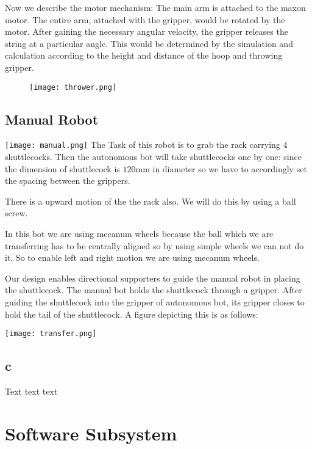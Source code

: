 \documentclass[11pt]{article}
\begin{document}
Now we describe the motor mechanism: 
The main arm is attached to the maxon motor. The entire arm,  attached with the gripper, would be rotated by the motor.
After gaining the necessary angular velocity, the gripper releases the string at a particular angle. This would be determined by the simulation and calculation according to the height and distance of the hoop and throwing gripper.

\begin{figure}[!htb]
\centering
\texttt{[image: thrower.png]}
\end{figure}

\subsection{Manual Robot}
	\texttt{[image: manual.png]}
	The Task of this robot is to grab the rack carrying $4$ shuttlecocks. Then the autonomous bot will take shuttlecocks one by one: since the dimension of shuttlecock is $120$mm in diameter so we have to accordingly set the spacing between the grippers.

	 There is a upward motion of the the rack also. We will do this by using a ball screw.
	
	In this bot we are using mecanum wheels because the ball which we are transferring has to be centrally aligned so by using simple wheels we can not do it. So to enable left and right motion we are using mecanum wheels.
    
Our design enables directional supporters to guide the manual robot in placing the shuttlecock. The manual bot holds the shuttlecock through a gripper. After guiding the shuttlecock into the gripper of autonomous bot, its gripper closes to hold the tail of the shuttlecock. A figure depicting this is as follows:

\texttt{[image: transfer.png]}

\pagebreak



\subsection{c}
Text text text
\pagebreak
\section{Software Subsystem}
\end{document}
